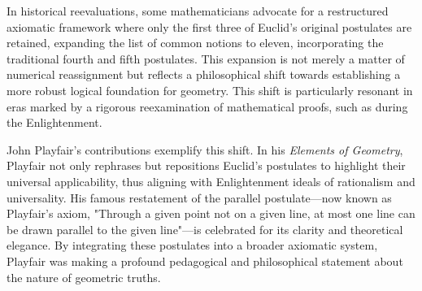 In historical reevaluations, some mathematicians advocate for a restructured axiomatic framework where only the first three of Euclid’s original postulates are retained, expanding the list of common notions to eleven, incorporating the traditional fourth and fifth postulates. This expansion is not merely a matter of numerical reassignment but reflects a philosophical shift towards establishing a more robust logical foundation for geometry. This shift is particularly resonant in eras marked by a rigorous reexamination of mathematical proofs, such as during the Enlightenment.

John Playfair’s contributions exemplify this shift. In his \textit{Elements of Geometry}, Playfair not only rephrases but repositions Euclid’s postulates to highlight their universal applicability, thus aligning with Enlightenment ideals of rationalism and universality. His famous restatement of the parallel postulate—now known as Playfair's axiom, "Through a given point not on a given line, at most one line can be drawn parallel to the given line"—is celebrated for its clarity and theoretical elegance. By integrating these postulates into a broader axiomatic system, Playfair was making a profound pedagogical and philosophical statement about the nature of geometric truths. 

\clearpage

